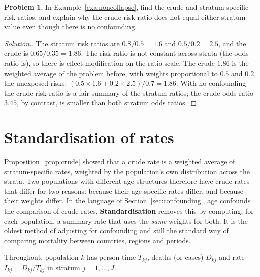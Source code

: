 \documentclass[11pt,a4paper]{article}
\numberwithin{equation}{section}
\theoremstyle{definition}
\newtheorem{problemx}{Problem}[subsection]
\newenvironment{problem}{\begin{problemx}}{\end{problemx}}
\newenvironment{solution}
  {\renewcommand{\qedsymbol}{}\begin{proof}[\textit{Solution}.]}
  {\end{proof}}
\begin{document}
\begin{problem}
In Example~\ref{exa:noncollapse}, find the crude and stratum-specific risk ratios, and explain why the crude risk ratio does not equal
either stratum value even though there is no confounding.
\end{problem}

\begin{solution}
The stratum risk ratios are $0.8/0.5 = 1.6$ and $0.5/0.2 = 2.5$, and the crude is $0.65/0.35 = 1.86$. The risk ratio is not constant across strata
(the odds ratio is), so there is effect modification on the ratio scale. The crude $1.86$ is the weighted average of the problem before,
with weights proportional to $0.5$ and $0.2$, the unexposed risks: $(0.5 \times 1.6 + 0.2 \times 2.5)/0.7 = 1.86$. With no confounding the crude risk ratio is a
fair summary of the stratum ratios; the crude odds ratio $3.45$, by contrast, is smaller than both stratum odds ratios.
\end{solution}

\section{Standardisation of rates}
\label{sec:standard}

Proposition~\ref{prop:crude} showed that a crude rate is a weighted average of stratum-specific rates, weighted by the population's own
distribution across the strata. Two populations with different age structures therefore have crude rates that differ for two reasons:
because their age-specific rates differ, and because their weights differ. In the language of Section~\ref{sec:confounding}, age
confounds the comparison of crude rates. \textbf{Standardisation} removes this by computing, for each population, a summary rate that
uses the \emph{same} weights for both. It is the oldest method of adjusting for confounding and still the standard way of comparing
mortality between countries, regions and periods.

Throughout, population $k$ has person-time $T_{kj}$, deaths (or cases) $D_{kj}$ and rate $I_{kj} = D_{kj}/T_{kj}$ in stratum $j = 1, \dots, J$.
\end{document}
